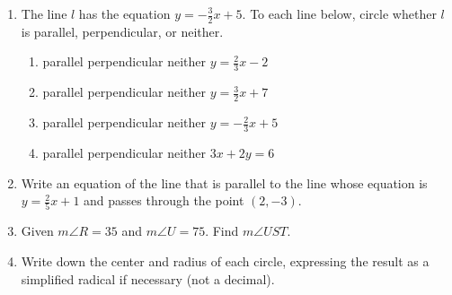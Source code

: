 \documentclass[12pt, twoside]{article}
\begin{document}
\begin{enumerate}
\newpage
  \item The line $l$ has the equation $y=-\frac{3}{2}x+5$. To each line below, circle whether $l$ is parallel, perpendicular, or neither.
    \begin{enumerate}
      \item parallel \quad perpendicular \quad neither \qquad $y=\frac{2}{3}x-2$
      \vspace{0.5cm}
      \item parallel \quad perpendicular \quad neither \qquad $y=\frac{3}{2}x+7$
      \vspace{0.5cm}
      \item parallel \quad perpendicular \quad neither \qquad $y=-\frac{2}{3}x+5$
      \vspace{0.5cm}
      \item parallel \quad perpendicular \quad neither \qquad $3x+2y=6$
      \vspace{3.5cm}
    \end{enumerate}

  \item Write an equation of the line that is parallel to the line whose equation is $y=\frac{2}{5}x+1$ and passes through the point $(2,-3)$. \vspace{2cm}

  \item Given $m\angle R=35$ and $m\angle U=75$. Find $m\angle UST$.\\[1cm]
   \vspace{1cm}

  \item Write down the center and radius of each circle, expressing the result as a simplified radical if necessary (not a decimal).
   \begin{enumerate}
   \end{enumerate} \vspace{2cm}


\end{enumerate}
\end{document}
